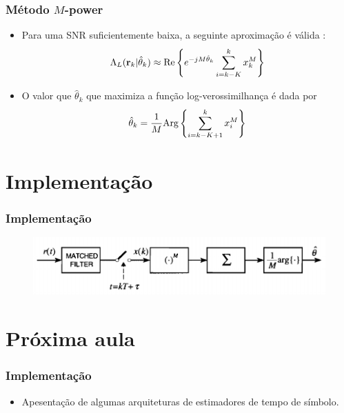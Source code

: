\begin{frame}[t]
	\frametitle{Método \(M\)-power}
	\begin{itemize}
		
		\item Para uma SNR suficientemente baixa, a seguinte aproximação é válida \cite{mengali2013synchronization}:
        \begin{align}
            \Lambda_L(\mathbf{r}_k|\hat{\theta}_{k}) \approx \textnormal{Re}\left\{e^{-jM \hat{\theta}_k} \sum_{i=k-K}^{k} x_{k}^{M} \right\}
        \end{align}
        \item O valor que \(\hat{\theta}_{k}\) que maximiza a função log-verossimilhança é dada por
        \begin{align}
            \hat{\theta}_{k} = \frac{1}{M} \textnormal{Arg}\left\{ \sum_{i=k-K+1}^{k} x_{i}^M \right\}
        \end{align}
	\end{itemize}
\end{frame}

\section{Implementação}
\begin{frame}[c]
    \frametitle{Implementação}

    \begin{figure}
        \includegraphics[scale=.3]{figs/m-power.png}
    \end{figure}
\end{frame}

\section{Próxima aula}
\begin{frame}[t]
    \frametitle{Implementação}

    \begin{itemize}
        \item Apesentação de algumas arquiteturas de estimadores de tempo de símbolo.
    \end{itemize}
\end{frame}